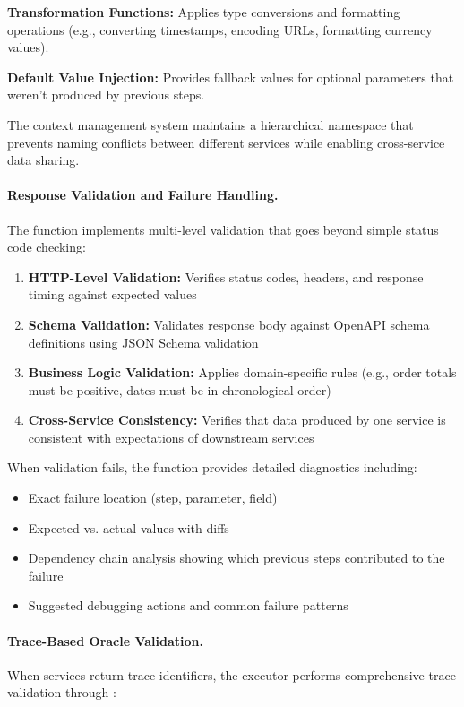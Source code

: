 \textbf{Transformation Functions:} Applies type conversions and
formatting operations (e.g., converting timestamps, encoding URLs,
formatting currency values).

\textbf{Default Value Injection:} Provides fallback values for
optional parameters that weren't produced by previous steps.

The context management system maintains a hierarchical namespace that
prevents naming conflicts between different services while enabling
cross-service data sharing.

\paragraph{Response Validation and Failure Handling.}
The  function implements multi-level
validation that goes beyond simple status code checking:

\begin{enumerate}[leftmargin=*]
  \item \textbf{HTTP-Level Validation:} Verifies status codes,
        headers, and response timing against expected values
  \item \textbf{Schema Validation:} Validates response body against
        OpenAPI schema definitions using JSON Schema validation
  \item \textbf{Business Logic Validation:} Applies domain-specific
        rules (e.g., order totals must be positive, dates must be
        in chronological order)
  \item \textbf{Cross-Service Consistency:} Verifies that data
        produced by one service is consistent with expectations
        of downstream services
\end{enumerate}

When validation fails, the  function provides
detailed diagnostics including:
\begin{itemize}[leftmargin=*]
  \item Exact failure location (step, parameter, field)
  \item Expected vs. actual values with diffs
  \item Dependency chain analysis showing which previous steps
        contributed to the failure
  \item Suggested debugging actions and common failure patterns
\end{itemize}

\paragraph{Trace-Based Oracle Validation.}
When services return trace identifiers, the executor performs
comprehensive trace validation through :

